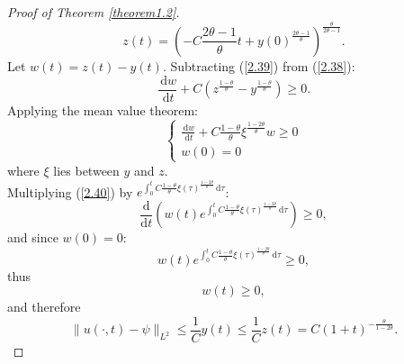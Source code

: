 \documentclass{article}
\numberwithin{equation}{section}
\begin{document}
\begin{proof}[Proof of Theorem \ref{theorem1.2}]
  $$z(t)=\left(-C\frac{2\theta-1}{\theta}t+y(0)^{\frac{2\theta-1}{\theta}}\right)^{\frac{\theta}{2\theta-1}}.$$
  Let $w(t)=z(t)-y(t)$. Subtracting (\ref{2.39}) from (\ref{2.38}):
  $$\frac{\,\mathrm{d}w}{\,\mathrm{d}t}+C(z^{\frac{1-\theta}{\theta}}-y^{\frac{1-\theta}{\theta}})\ge 0.$$
  Applying the mean value theorem:
  \begin{equation}
      \begin{cases}
          \frac{\,\mathrm{d}w}{\,\mathrm{d}t}+C\frac{1-\theta}{\theta}\xi^{\frac{1-2\theta}{\theta}}w\ge 0 \\
          w(0)=0 \label{2.40}
      \end{cases}
  \end{equation}
  where $\xi$ lies between $y$ and $z$.\\
  Multiplying (\ref{2.40}) by $e^{\int_{0}^{t}C\frac{1-\theta}{\theta}\xi(\tau)^{\frac{1-2\theta}{\theta}}\,\mathrm{d}\tau}$:
  $$\frac{\mathrm{d}}{\mathrm{d}t}\left(w(t)e^{\int_{0}^{t}C\frac{1-\theta}{\theta}\xi(\tau)^{\frac{1-2\theta}{\theta}}\,\mathrm{d}\tau}\right)\ge 0,$$
  and since $w(0)=0$:
  $$w(t)e^{\int_{0}^{t}C\frac{1-\theta}{\theta}\xi(\tau)^{\frac{1-2\theta}{\theta}}\,\mathrm{d}\tau}\ge 0,$$
  thus
  $$w(t)\ge 0,$$
  and therefore
  $$\|u(\cdot,t)-\psi\|_{L^2}\le \frac{1}{C}y(t)\le \frac{1}{C}z(t)=C(1+t)^{-\frac{\theta}{1-2\theta}}.$$


\end{proof}
\end{document}
